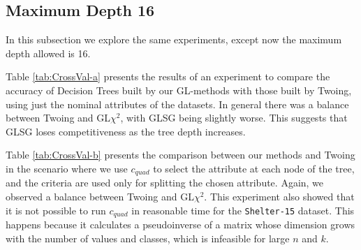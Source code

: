 \subsection{Maximum Depth 16}


In this subsection we explore the same experiments, except now the maximum depth allowed is 16. 


Table \ref{tab:CrossVal-a} presents  the results of an experiment to
compare the accuracy of  Decision Trees built by our GL-methods with those built by Twoing, using just the nominal attributes of the datasets.
In general there was a balance between Twoing and GL$\chi^2$, with GLSG being slightly worse. This suggests that GLSG loses competitiveness as the tree depth increases.

Table \ref{tab:CrossVal-b} presents the 
comparison between  our  methods and Twoing in the scenario where we use $c_{quad}$ to select the attribute at each node of the tree, and the criteria are used only for splitting the chosen attribute. Again, we observed a balance between Twoing and GL$\chi^2$. This experiment also showed that it is not possible to run $c_{quad}$ in reasonable time for the {\tt Shelter-15} dataset. This happens because it calculates a pseudoinverse of a matrix whose dimension grows with the number of values and classes, which is infeasible for large $n$ and $k$.


